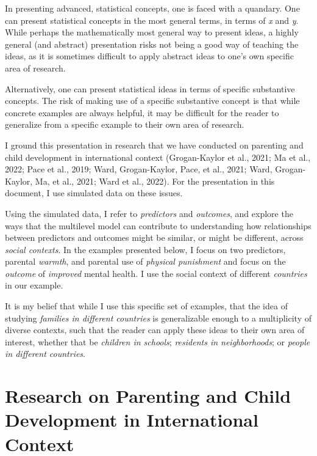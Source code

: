 \documentclass[
  letterpaper,
  DIV=11,
  numbers=noendperiod]{scrreprt}
\begin{document}
In presenting advanced, statistical concepts, one is faced with a
quandary. One can present statistical concepts in the most general
terms, in terms of \emph{x} and \emph{y}. While perhaps the
mathematically most general way to present ideas, a highly general (and
abstract) presentation risks not being a good way of teaching the ideas,
as it is sometimes difficult to apply abstract ideas to one's own
specific area of research.

Alternatively, one can present statistical ideas in terms of specific
substantive concepts. The risk of making use of a specific substantive
concept is that while concrete examples are always helpful, it may be
difficult for the reader to generalize from a specific example to their
own area of research.

I ground this presentation in research that we have conducted on
parenting and child development in international context (Grogan-Kaylor
et al., 2021; Ma et al., 2022; Pace et al., 2019; Ward, Grogan-Kaylor,
Pace, et al., 2021; Ward, Grogan-Kaylor, Ma, et al., 2021; Ward et al.,
2022). For the presentation in this document, I use simulated data on
these issues.

Using the simulated data, I refer to \emph{predictors} and
\emph{outcomes}, and explore the ways that the multilevel model can
contribute to understanding how relationships between predictors and
outcomes might be similar, or might be different, across \emph{social
contexts}. In the examples presented below, I focus on two predictors,
parental \emph{warmth}, and parental use of \emph{physical punishment}
and focus on the \emph{outcome} of \emph{improved} mental health. I use
the social context of different \emph{countries} in our example.

It is my belief that while I use this specific set of examples, that the
idea of studying \emph{families in different countries} is generalizable
enough to a multiplicity of diverse contexts, such that the reader can
apply these ideas to their own area of interest, whether that be
\emph{children in schools}; \emph{residents in neighborhoods}; or
\emph{people in different countries}.

\hypertarget{research-on-parenting-and-child-development-in-international-context}{%
\section{Research on Parenting and Child Development in International
Context}\label{research-on-parenting-and-child-development-in-international-context}}
\end{document}
